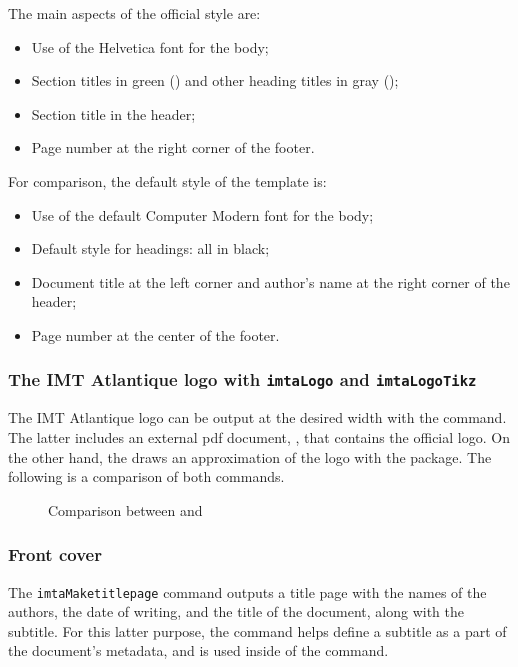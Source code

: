 \documentclass{report}
\begin{document}
The main aspects of the official style are:

\begin{itemize}
    \item Use of the Helvetica font for the body;
    \item Section titles in green () and other heading titles in gray ();
    \item Section title in the header;
    \item Page number at the right corner of the footer.
\end{itemize}

For comparison, the default style of the template is:

\begin{itemize}
    \item Use of the default Computer Modern font for the body;
    \item Default style for headings: all in black;
    \item Document title at the left corner and author's name at the right corner of the header;
    \item Page number at the center of the footer.
\end{itemize}

\subsubsection{The IMT Atlantique logo with \texttt{imtaLogo} and \texttt{imtaLogoTikz}}
The IMT Atlantique logo can be output at the desired width with the  command.
The latter includes an external pdf document, , that contains the official logo.
On the other hand, the  draws an approximation of the logo with the  package.
The following is a comparison of both commands.

\begin{figure}[H]
    \centering
    \fbox{\imtaLogo{5cm}}
    \fbox{\imtaLogoTikz{5cm}}
    \caption{Comparison between  and }
    \label{fig:imtaLogo}
\end{figure}


\subsubsection{Front cover}
The \texttt{imtaMaketitlepage} command outputs a title page with the names of the authors, the date of writing, and the title of the document, along with the subtitle.
For this latter purpose, the  command helps define a subtitle as a part of the document's metadata, and %
is used inside of the  command.
\end{document}

